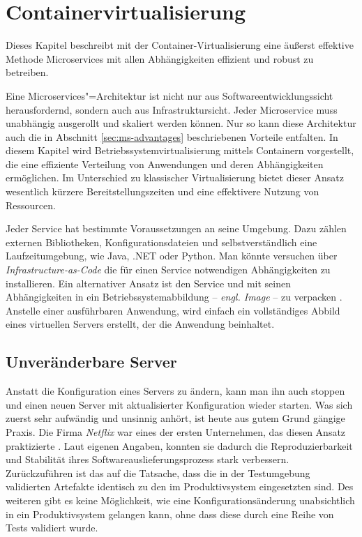 \chapter{Containervirtualisierung}

Dieses Kapitel beschreibt mit der Container-Virtualisierung eine äußerst effektive Methode Microservices mit allen Abhängigkeiten effizient und robust zu betreiben.

Eine Microservices"=Architektur ist nicht nur aus Softwareentwicklungssicht herausfordernd, sondern auch aus Infrastruktursicht. Jeder Microservice muss unabhängig ausgerollt und skaliert werden können. Nur so kann diese Architektur auch die in Abschnitt \ref{sec:ms-advantages} beschriebenen Vorteile entfalten. In diesem Kapitel wird Betriebssystemvirtualisierung mittels Containern vorgestellt, die eine effiziente Verteilung von Anwendungen und deren Abhängigkeiten ermöglichen. Im Unterschied zu klassischer Virtualisierung bietet dieser Ansatz wesentlich kürzere Bereitstellungszeiten und eine effektivere Nutzung von Ressourcen.

Jeder Service hat bestimmte Voraussetzungen an seine Umgebung. Dazu zählen externen Bibliotheken, Konfigurationsdateien und selbstverständlich eine Laufzeitumgebung, wie \zB Java, .NET oder Python. Man könnte versuchen über \textit{Infrastructure-as-Code} die für einen Service notwendigen Abhängigkeiten zu installieren. Ein alternativer Ansatz ist den Service und mit seinen Abhängigkeiten in ein Betriebssystemabbildung -- \textit{engl. Image} -- zu verpacken \cite[113]{newman2015building}. Anstelle einer ausführbaren Anwendung, wird einfach ein vollständiges Abbild eines virtuellen Servers erstellt, der die Anwendung beinhaltet.

\section{Unveränderbare Server}

Anstatt die Konfiguration eines Servers zu ändern, kann man ihn auch stoppen und einen neuen Server mit aktualisierter Konfiguration wieder starten. Was sich zuerst sehr aufwändig und unsinnig anhört, ist heute aus gutem Grund gängige Praxis. Die Firma \textit{Netflix} war eines der ersten Unternehmen, das diesen Ansatz praktizierte \cite{NflxLegos}. Laut eigenen Angaben, konnten sie dadurch die Reproduzierbarkeit und Stabilität ihres Softwareauslieferungsprozess stark verbessern. Zurückzuführen ist das auf die Tatsache, dass die in der Testumgebung validierten Artefakte identisch zu den im Produktivsystem eingesetzten sind. Des weiteren gibt es keine Möglichkeit, wie eine Konfigurationsänderung unabsichtlich in ein Produktivsystem gelangen kann, ohne dass diese durch eine Reihe von Tests validiert wurde.

